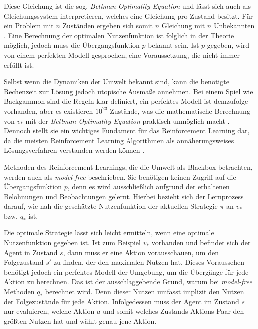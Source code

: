 Diese Gleichung ist die sog. \textit{Bellman Optimality Equation} und lässt sich auch als Gleichungssystem interpretieren, welches eine Gleichung pro Zustand besitzt. Für ein Problem mit $n$ Zuständen ergeben sich somit $n$ Gleichung mit $n$ Unbekannten \cite[S.~63]{Sutton1998}. Eine Berechnung der optimalen Nutzenfunktion ist folglich in der Theorie möglich, jedoch muss die Übergangsfunktion $p$ bekannt sein. Ist $p$ gegeben, wird von einem perfekten Modell gesprochen, eine Voraussetzung, die nicht immer erfüllt ist.
\par 
Selbst wenn die Dynamiken der Umwelt bekannt sind, kann die benötigte Rechenzeit zur Lösung jedoch utopische Ausmaße annehmen. Bei einem Spiel wie \glqq Backgammon\grqq{} sind die Regeln klar definiert, ein perfektes Modell ist demzufolge vorhanden, aber es existieren $10^{23}$ Zustände, was die mathematische Berechnung von $v_*$ mit der \textit{Bellman Optimality Equation} praktisch unmöglich macht \cite[S.~66]{Sutton1998}. Dennoch stellt sie ein wichtiges Fundament für das Reinforcement Learning dar, da die meisten Reinforcement Learning Algorithmen als annäherungsweises Lösungsverfahren verstanden werden können \cite[S.~66]{Sutton1998}. 
\par 
Methoden des Reinforcement Learnings, die die Umwelt als Blackbox betrachten, werden auch als \textit{model-free} beschrieben. Sie benötigen keinen Zugriff auf die Übergangsfunktion $p$, denn es wird ausschließlich aufgrund der erhaltenen Belohnungen und Beobachtungen gelernt. Hierbei bezieht sich der Lernprozess darauf, wie nah die geschätzte Nutzenfunktion der aktuellen Strategie $\pi$ an $v_*$ bzw. $q_*$ ist.
\par 
Die optimale Strategie lässt sich leicht ermitteln, wenn eine optimale Nutzenfunktion gegeben ist. Ist zum Beispiel $v_*$ vorhanden und befindet sich der Agent in Zustand $s$, dann muss er eine Aktion vorausschauen, um den Folgezustand $s'$ zu finden, der den maximalen Nutzen hat. Dieses Voraussehen benötigt jedoch ein perfektes Modell der Umgebung, um die Übergänge für jede Aktion zu berechnen. Das ist der ausschlaggebende Grund, warum bei \textit{model-free} Methoden $q_*$ berechnet wird. Denn dieser Nutzen umfasst implizit den Nutzen der Folgezustände für jede Aktion. Infolgedessen muss der Agent im Zustand $s$ nur evaluieren, welche Aktion $a$ und somit welches Zustands-Aktions-Paar den größten Nutzen hat und wählt genau jene Aktion.
\par 

\par 